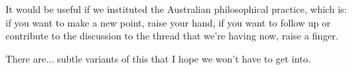 It would be useful if we instituted the Australian philosophical practice, which is: if you want to make a new point, raise your hand, if you want to follow up or contribute to the discussion to the thread that we're having now, raise a finger.

There are... subtle variants of this that I hope we won't have to get into.